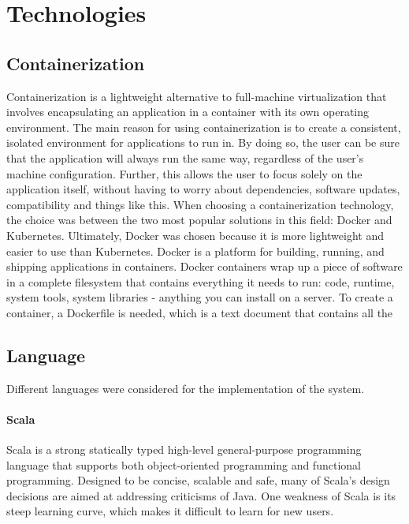 \documentclass[12pt,a4paper,openright,twoside]{book}
\begin{document}
\section{Technologies}

\subsection{Containerization}
Containerization is a lightweight alternative to full-machine virtualization that involves encapsulating 
an application in a container with its own operating environment.
The main reason for using containerization is to create a consistent, isolated environment for applications to run in.
By doing so, the user can be sure that the application will always run the same way, regardless of the user's machine configuration. 
Further, this allows the user to focus solely on the application itself, without having to worry about dependencies, software updates, compatibility and things like this.
When choosing a containerization technology, the choice was between the two most popular solutions in this field: Docker and Kubernetes.
Ultimately, Docker was chosen because it is more lightweight and easier to use than Kubernetes.
Docker is a platform for building, running, and shipping applications in containers.
Docker containers wrap up a piece of software in a complete filesystem that contains everything it needs to run:
code, runtime, system tools, system libraries - anything you can install on a server.
To create a container, a Dockerfile is needed, which is a text document that contains all the 


\subsection{Language}
Different languages were considered for the implementation of the system.

\paragraph*{Scala}
Scala is a strong statically typed high-level general-purpose programming language that supports both object-oriented 
programming and functional programming. 
Designed to be concise, scalable and safe, many of Scala's design decisions are aimed at addressing criticisms of Java.
\cite{enwiki:1179700699}
One weakness of Scala is its steep learning curve, which makes it difficult to learn for new users.
\end{document}
